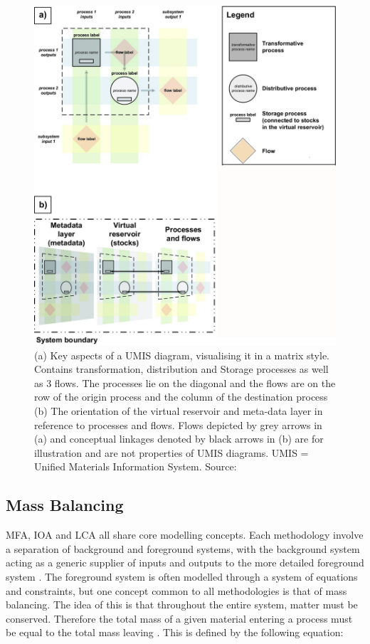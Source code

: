 \documentclass[ %
                    author={Tom Jager},
                supervisor={Dr. Daniel Schien},
                    degree={MEng},
                     title={A Bayesian Inference Engine for Calibrating Uncertainty over UMIS Structured MFA Systems},
                  subtitle={},
                      type={research},
                      year={2019} ]{dissertation}
\begin{document}
\begin{figure}[]
\centering
\includegraphics[width=\textwidth]{images/umis_aspects.jpg}
\caption{(a) Key aspects of a UMIS diagram, visualising it in a matrix style. Contains transformation, distribution and Storage processes as well as 3 flows. The processes lie on the diagonal and the flows are on the row of the origin process and the column of the destination process (b) The orientation of the virtual reservoir and meta-data layer in reference to processes and flows. Flows depicted by grey arrows in (a) and conceptual linkages denoted by black arrows in (b) are for illustration and are not properties of UMIS diagrams. UMIS = Unified Materials Information System. Source: \cite{myers2019unified}}
\label{fig:umis_aspects}
\end{figure}

\subsection{Mass Balancing}
\label{sec:mass_balance}
MFA, IOA and LCA all share core modelling concepts. Each methodology involve a separation of background and foreground systems, with the background system acting as a generic supplier of inputs and outputs to the more detailed foreground system \cite{pauliuk2016prospective}. The foreground system is often modelled through a system of equations and constraints, but one concept common to all methodologies is that of mass balancing. The idea of this is that throughout the entire system, matter must be conserved. Therefore the total mass of a given material entering a process must be equal to the total mass leaving \cite{brunner2004practical}. This is defined by the following equation:
\end{document}
